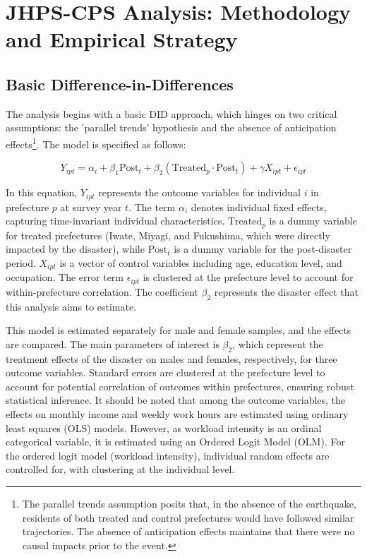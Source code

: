 \documentclass[a4paper,12pt]{article}
\begin{document}
\newpage

\section{JHPS-CPS Analysis: Methodology and Empirical Strategy}

\subsection{Basic Difference-in-Differences}

The analysis begins with a basic DID approach, which hinges on two critical assumptions: the 'parallel trends' hypothesis and the absence of anticipation effects\footnote{The parallel trends assumption posits that, in the absence of the earthquake, residents of both treated and control prefectures would have followed similar trajectories. The absence of anticipation effects maintains that there were no causal impacts prior to the event.}. The model is specified as follows:

\begin{equation}
Y_{ipt} = \alpha_i + \beta_1 \text{Post}_t + \beta_2 (\text{Treated}_p \cdot \text{Post}_t) + \gamma X_{ipt} + \epsilon_{ipt}
\end{equation}

In this equation, $Y_{ipt}$ represents the outcome variables for individual $i$ in prefecture $p$ at survey year $t$. The term $\alpha_i$ denotes individual fixed effects, capturing time-invariant individual characteristics. $\text{Treated}_p$ is a dummy variable for treated prefectures (Iwate, Miyagi, and Fukushima, which were directly impacted by the disaster), while $\text{Post}_t$ is a dummy variable for the post-disaster period. $X_{ipt}$ is a vector of control variables including age, education level, and occupation. The error term $\epsilon_{ipt}$ is clustered at the prefecture level to account for within-prefecture correlation. The coefficient $\beta_2$ represents the disaster effect that this analysis aims to estimate.

This model is estimated separately for male and female samples, and the effects are compared. The main parameters of interest is $\beta_2$, which represent the treatment effects of the disaster on males and females, respectively, for three outcome variables. Standard errors are clustered at the prefecture level to account for potential correlation of outcomes within prefectures, ensuring robust statistical inference. It should be noted that among the outcome variables, the effects on monthly income and weekly work hours are estimated using ordinary least squares (OLS) models. However, as workload intensity is an ordinal categorical variable, it is estimated using an Ordered Logit Model (OLM). For the ordered logit model (workload intensity), individual random effects are controlled for, with clustering at the individual level.
\end{document}
